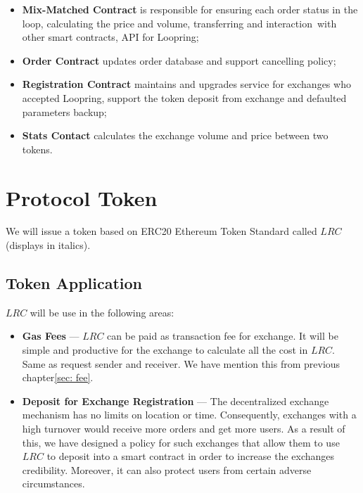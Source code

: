 \documentclass[UTF8,nofonts]{article}
\begin{document}
\begin{itemize}
 \item \textbf{Mix-Matched Contract} is responsible for ensuring each order status in the loop, calculating the price and volume,  transferring and interaction with other smart contracts, API for Loopring;
 \item  \textbf{Order Contract} updates order database and support cancelling policy;
 \item \textbf{Registration Contract} maintains and upgrades service for exchanges who accepted Loopring, support the token deposit from exchange and defaulted parameters backup;
 \item \textbf{Stats Contact} calculates the exchange volume and price between two tokens.

\end{itemize}

\section{Protocol Token \label{sec: protocoltoken}}


We will issue a token based on ERC20 Ethereum Token Standard called $LRC$ (displays in italics).


\subsection{Token Application}

$LRC$ will be use in the following areas:

\begin{itemize}
 \item \textbf{Gas Fees} --- $LRC$ can be paid as transaction fee for exchange. It will be simple and productive for the exchange to calculate all the cost in $LRC$. Same as request sender and receiver. We have mention this from previous chapter\ref{sec: fee}.
 \item \textbf{Deposit for Exchange Registration} --- The decentralized exchange mechanism has no limits on location or time. Consequently, exchanges with a high turnover would receive more orders and get more users. As a result of this, we have designed a policy for such exchanges that allow them to use $LRC$ to deposit into a smart contract in order to increase the exchanges credibility. Moreover, it can also protect users from certain adverse circumstances.
\end{itemize}
\end{document}
